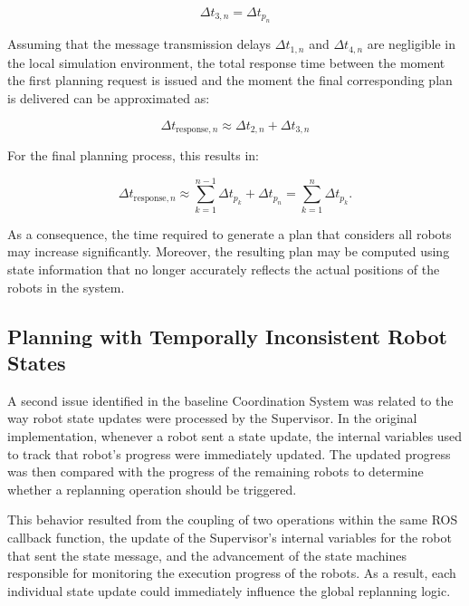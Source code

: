 \begin{equation}
    \Delta t_{3,n} = \Delta t_{p_n}
\end{equation}

Assuming that the message transmission delays $\Delta t_{1,n}$ and $\Delta t_{4,n}$ are negligible in the local simulation environment, the total response time between the moment the first planning request is issued and the moment the final corresponding plan is delivered can be approximated as:

\begin{equation}
    \Delta t_{\text{response},n} \approx \Delta t_{2,n} + \Delta t_{3,n}
\end{equation}

For the final planning process, this results in:

\begin{equation}
    \Delta t_{\text{response},n}
    \approx
    \sum_{k=1}^{n-1} \Delta t_{p_k} + \Delta t_{p_n}
    =
    \sum_{k=1}^{n} \Delta t_{p_k}.
    \label{eq:baseline_response_time}
\end{equation}

As a consequence, the time required to generate a plan that considers all robots may increase significantly. Moreover, the resulting plan may be computed using state information that no longer accurately reflects the actual positions of the robots in the system.

\subsection{Planning with Temporally Inconsistent Robot States}
\label{subsec:temporally_inconsistent_states}
\hspace{\parindent}
A second issue identified in the baseline Coordination System was related to the way robot state updates were processed by the Supervisor. In the original implementation, whenever a robot sent a state update, the internal variables used to track that robot's progress were immediately updated. The updated progress was then compared with the progress of the remaining robots to determine whether a replanning operation should be triggered.

This behavior resulted from the coupling of two operations within the same ROS callback function, the update of the Supervisor's internal variables for the robot that sent the state message, and the advancement of the state machines responsible for monitoring the execution progress of the robots. As a result, each individual state update could immediately influence the global replanning logic.

